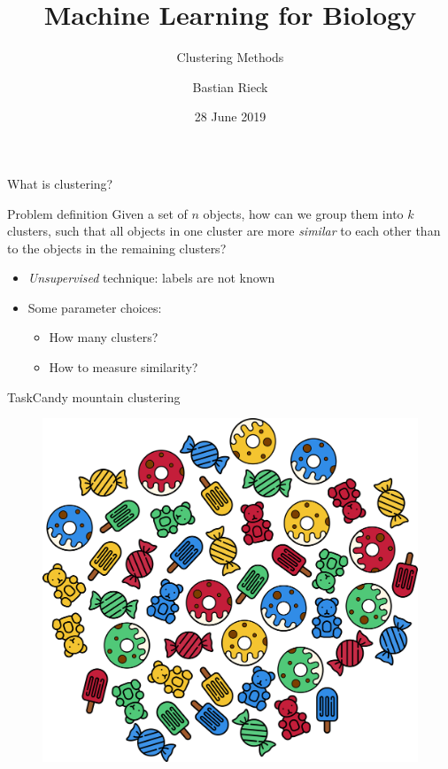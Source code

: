 \documentclass[aspectratio=169]{beamer}
\title{Machine Learning for Biology}
\subtitle{Clustering Methods}
\author{Bastian Rieck}
\institute{%
}
\date{28 June 2019}
\begin{document}
  \begin{frame}{What is clustering?}

    \begin{block}{Problem definition}
      Given a set of $n$ objects, how can we group them into $k$
      clusters, such that all objects in one cluster are more
      \emph{similar} to each other than to the objects in the
      remaining clusters?
    \end{block}

    \vfill

    \begin{itemize}
      \item \emph{Unsupervised} technique: labels are not known
      \item Some parameter choices:
        \begin{itemize}
          \item How many clusters?
          \item How to measure similarity?
        \end{itemize}
    \end{itemize}
  \end{frame}

  \begin{frame}{Task}{Candy mountain clustering}
    \begin{figure}
      \includegraphics[width=0.50\linewidth]{Figures/Candy_mountain}
    \end{figure}
  \end{frame}
\end{document}
